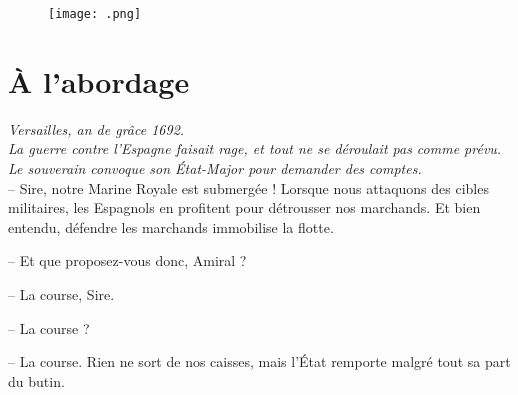     \vspace{1cm}
    \begin{figure}[!h]
    \centering
    \texttt{[image: .png]}
    \caption{}
    \end{figure}
\fi


\newcommand{\culdelampe}[0]{\begin{center}
*

* *\end{center}}



\section{À l'abordage}

\textit{Versailles, an de grâce 1692.}\\

\textit{La guerre contre l'Espagne faisait rage, et tout ne se déroulait pas comme prévu. Le souverain convoque son État-Major pour demander des comptes.}\\

-- Sire, notre Marine Royale est submergée ! Lorsque nous attaquons des cibles militaires, les Espagnols en profitent pour détrousser nos marchands. Et bien entendu, défendre les marchands immobilise la flotte.

-- Et que proposez-vous donc, Amiral ?

-- La course, Sire.

-- La course ?

-- La course. Rien ne sort de nos caisses, mais l'État remporte malgré tout sa part du butin.

